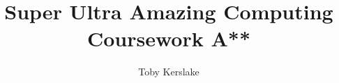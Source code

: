 \documentclass{report}
\begin{document}
\title{Super Ultra Amazing Computing Coursework A**}
\author{Toby Kerslake}
\maketitle
\tableofcontents






\end{document}
